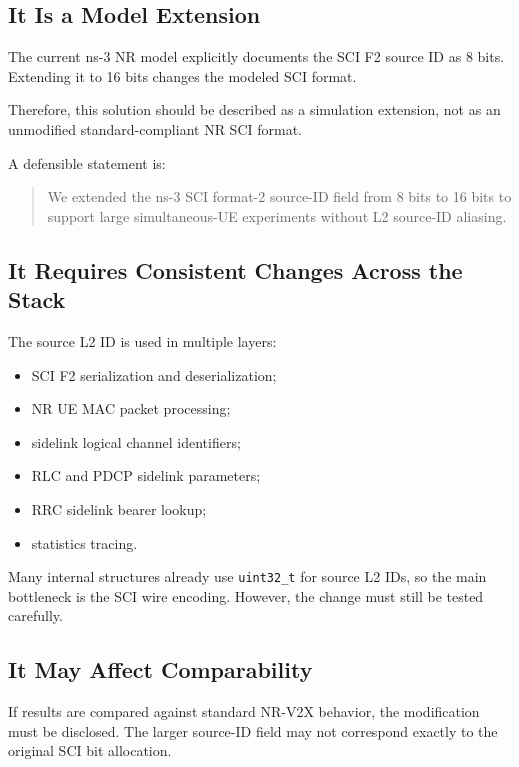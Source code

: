 \documentclass[11pt]{article}
\begin{document}
\subsection{It Is a Model Extension}

The current ns-3 NR model explicitly documents the SCI F2 source ID as 8 bits. Extending it to 16 bits changes the modeled SCI format.

Therefore, this solution should be described as a simulation extension, not as an unmodified standard-compliant NR SCI format.

A defensible statement is:

\begin{quote}
We extended the ns-3 SCI format-2 source-ID field from 8 bits to 16 bits to support large simultaneous-UE experiments without L2 source-ID aliasing.
\end{quote}

\subsection{It Requires Consistent Changes Across the Stack}

The source L2 ID is used in multiple layers:

\begin{itemize}
    \item SCI F2 serialization and deserialization;
    \item NR UE MAC packet processing;
    \item sidelink logical channel identifiers;
    \item RLC and PDCP sidelink parameters;
    \item RRC sidelink bearer lookup;
    \item statistics tracing.
\end{itemize}

Many internal structures already use \texttt{uint32\_t} for source L2 IDs, so the main bottleneck is the SCI wire encoding. However, the change must still be tested carefully.

\subsection{It May Affect Comparability}

If results are compared against standard NR-V2X behavior, the modification must be disclosed. The larger source-ID field may not correspond exactly to the original SCI bit allocation.
\end{document}

